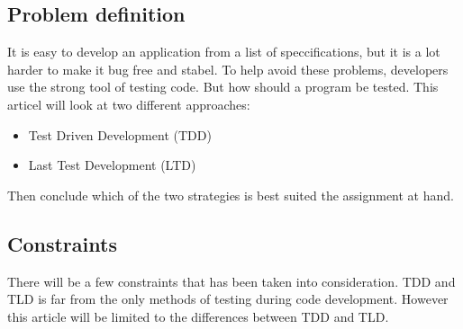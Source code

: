 \subsection{Problem definition}
\label{section:problem}
It is easy to develop an application from a list of speccifications,
 but it is a lot harder to make it bug free and stabel. 
 To help avoid these problems, developers use the strong tool of testing code. 
 But how should a program be tested. 
 This articel will look at two different approaches:
\begin{itemize}
\item Test Driven Development (TDD)
\item Last Test Development (LTD) 
\end{itemize}
Then conclude which of the two strategies is best suited the assignment at hand.



\subsection{Constraints}
There will be a few constraints that has been taken into consideration.
TDD and TLD is far from the only methods of testing during code development.
However this article will be limited to the differences between TDD and TLD.








